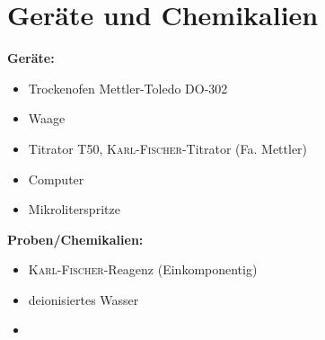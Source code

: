 \newpage
\section{Geräte und Chemikalien}
\label{sec:geraete}

\textbf{Geräte:}
\begin{itemize}
\item Trockenofen Mettler-Toledo DO-302
\item Waage
\item Titrator T50, \textsc{Karl-Fischer}-Titrator (Fa. Mettler)
\item Computer
\item Mikroliterspritze
\end{itemize}

\vspace*{5mm}

\textbf{Proben/Chemikalien:}
\begin{itemize}
\item \textsc{Karl-Fischer}-Reagenz (Einkomponentig)
\item deionisiertes Wasser
\item 

\end{itemize}





